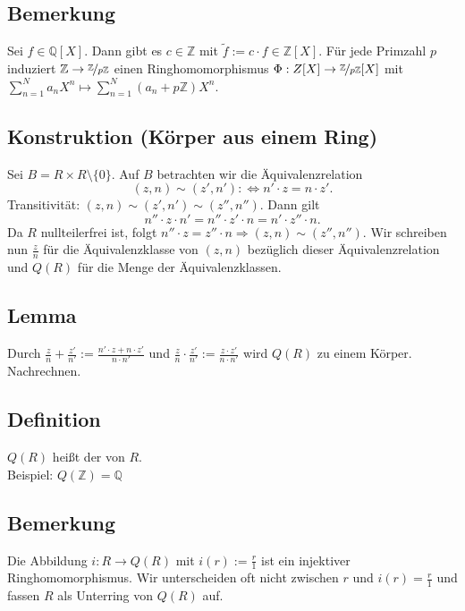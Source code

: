 \subsection[Bemerkung: Werkzeuge für den Beweis des Satzes]{Bemerkung} %
\label{sub:83}
Sei $f \in \mathds{Q}[X]$. Dann gibt es $c \in \mathds{Z}$ mit $\tilde f := c \cdot f \in \mathds{Z}[X]$. Für jede Primzahl $p$ induziert 
$\mathds{Z} \to \nicefrac{\mathds{Z}}{p \mathds{Z}}$ einen
Ringhomomorphismus $\Phi : Z[X] \to \nicefrac{\mathds{Z}}{p \mathds{Z}}[X]$ mit $\sum_{n=1}^{N} a_n X^n \mapsto \sum_{n=1}^{N}(a_n + p \mathds{Z}) X^n$.

\subsection{Konstruktion (Körper aus einem Ring)} %
\label{sub:84}
Sei $B = R \times R\setminus \{0\}$. Auf $B$ betrachten wir die Äquivalenzrelation 
\[
	(z,n) \sim (z',n') :\Leftrightarrow n'\cdot  z = n \cdot z'.
\]
Transitivität: $(z,n) \sim (z',n') \sim (z'',n'')$. Dann gilt
\[
	n'' \cdot z \cdot  n' = n'' \cdot z'\cdot  n = n' \cdot z'' \cdot n. 
\]
Da $R$ nullteilerfrei ist, folgt $n'' \cdot z = z'' \cdot n \Rightarrow (z,n) \sim (z'',n'')$. Wir schreiben nun $\frac{z}{n} $ für die Äquivalenzklasse von $(z,n)$
bezüglich dieser Äquivalenzrelation und $Q(R)$ für die Menge der Äquivalenzklassen.

\subsection[Lemma: Körperstruktur auf $Q(R)$]{Lemma} %
\label{sub:85}
Durch $\frac{z}{n} + \frac{z'}{n'} := \frac{n' \cdot z+ n \cdot z'}{n \cdot n'}$ und $\frac{z}{n} \cdot \frac{z'}{n'} := \frac{z \cdot z'}{n \cdot n'}$ wird $Q(R)$ zu einem
Körper.
Nachrechnen.

\subsection[Definition: Quotientenkörper]{Definition} %
\label{sub:86}
$Q(R)$ heißt der  von $R$. \\
Beispiel: $Q(\mathds{Z}) = \mathds{Q}$ 

\subsection[Bemerkung: Einbettung des Ringes in seinen Quotientenkörper]{Bemerkung} %
\label{sub:87}
Die Abbildung $i : R \to Q(R)$ mit $i(r) := \frac{r}{1} $ ist ein injektiver Ringhomomorphismus. Wir unterscheiden oft nicht zwischen $r$ und $i(r)= \frac{r}{1} $ und 
fassen $R$ als Unterring von $Q(R)$ auf.

